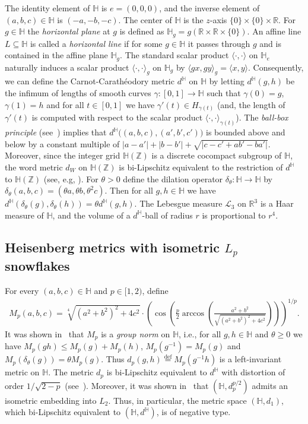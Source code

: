 \documentclass{icm2010}
\theoremstyle{definition}
\newcommand{\R}{\mathbb{R}}
\newcommand{\eqdef}{\stackrel{\mathrm{def}}{=}}
\newcommand{\1}{\mathbf{1}}
\renewcommand{\H}{\mathbb{H}}
\newcommand{\Z}{\mathbb{Z}}
\renewcommand{\le}{\leqslant}
\renewcommand{\ge}{\geqslant}
\renewcommand{\L}{\mathscr{L}}
\begin{document}
The identity element of $\H$ is $e=(0,0,0)$, and the inverse element
of $(a,b,c)\in \H$ is $(-a,-b,-c)$. The center of $\H$ is the
$z$-axis $\{0\}\times\{0\}\times \R$. For $g\in \H$ the {\em
horizontal plane} at $g$ is defined as
$\H_g=g(\R\times\R\times\{0\})$. An affine line $L\subseteq \H$ is
called a {\em horizontal line} if for some $g\in \H$ it passes
through $g$ and is contained in the affine plane $\H_g$. The
standard scalar product $\langle \cdot,\cdot\rangle$ on $\H_e$
naturally induces a scalar product $\langle \cdot,\cdot\rangle_g$ on
$\H_g$ by $\langle gx,gy\rangle_g=\langle x,y\rangle$. Consequently,
we can define the Carnot-Carath\'eodory metric $d^\H$ on $\H$ by
letting $d^\H(g,h)$ be the infimum of lengths of smooth curves
$\gamma:[0,1]\to \H$ such that $\gamma(0)=g$, $\gamma(1)=h$ and for
all $t\in [0,1]$ we have $\gamma'(t)\in H_{\gamma(t)}$ (and, the
length of $\gamma'(t)$ is computed with respect to the scalar
product $\langle \cdot,\cdot\rangle_{\gamma(t)}$). The {\em ball-box
principle} (see~\cite{gromov}) implies that
$d^\H\big((a,b,c),(a',b',c')\big)$ is bounded above and below by a
constant multiple of $|a-a'|+|b-b'|+\sqrt{|c-c'+ab'-ba'|}$.
Moreover, since the integer grid $\H(\Z)$ is a discrete cocompact
subgroup of $\H$, the word metric $d_W$ on $\H(\Z)$ is bi-Lipschitz
equivalent to the restriction of $d^\H$ to $\H(\Z)$ (see, e.g,
\cite{BBI}). For $\theta>0$ define the dilation operator
$\delta_\theta:\H\to \H$ by $\delta_\theta(a,b,c)=(\theta a ,\theta
b,\theta^2 c)$. Then for all $g,h\in \H$ we have
$d^\H(\delta_\theta(g),\delta_\theta(h))=\theta d^\H(g,h)$. The
Lebesgue measure $\L_3$ on $\R^3$ is a Haar measure of $\H$, and the
volume of a $d^\H$-ball of radius $r$ is proportional to $r^4$.





\subsection{Heisenberg metrics with isometric $L_p$ snowflakes}\label{sec:snowflake} For every
$(a,b,c)\in \H$ and  $p\in [1,2)$, define
\begin{eqnarray*}\label{eq:defM}
M_p(a,b,c)=
\sqrt[4]{(a^2+b^2)^2+4c^2}\cdot \left(\cos\left(\frac{p}{2}\arccos\left(\frac{a^2+b^2}{\sqrt{(a^2+b^2)^2+4c^2}}\right)\right)\right)^{1/p}.
\end{eqnarray*}
It was shown in~\cite{LN06} that $M_p$ is a {\em group norm} on
$\H$, i.e., for all $g,h\in \H$ and $\theta\ge 0$ we have
$M_p(gh)\le M_p(g)+M_p(h)$, $M_p(g^{-1})=M_p(g)$ and
$M_p(\delta_\theta(g))=\theta M_p(g)$. Thus $d_p(g,h)\eqdef
M_p(g^{-1}h)$ is a left-invariant metric on $\H$. The metric $d_p$
is bi-Lipschitz equivalent to $d^\H$ with distortion of order
$1/\sqrt{2-p}$ (see~\cite{LN06}). Moreover, it was shown
in~\cite{LN06} that $(\H,d_p^{p/2})$ admits an isometric embedding
into $L_2$. Thus, in particular, the metric space $(\H,d_1)$, which
bi-Lipschitz equivalent to $(\H,d^\H)$, is of negative type.
\end{document}
